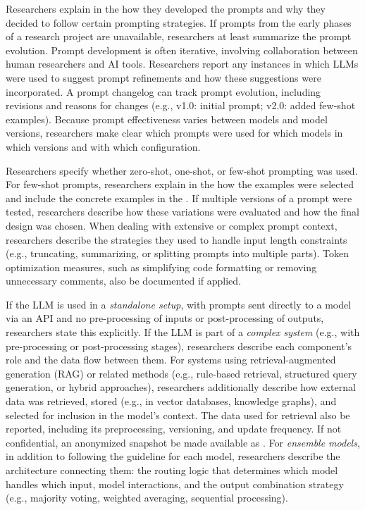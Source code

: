 Researchers \should explain in the \paper how they developed the prompts and why they decided to follow certain prompting strategies.
If prompts from the early phases of a research project are unavailable, researchers \should at least summarize the prompt evolution.
Prompt development is often iterative, involving collaboration between human researchers and AI tools.
Researchers \should report any instances in which LLMs were used to suggest prompt refinements and how these suggestions were incorporated.
A prompt changelog can track prompt evolution, including revisions and reasons for changes (e.g., v1.0: initial prompt; v2.0: added few-shot examples).
Because prompt effectiveness varies between models and model versions, researchers \must make clear which prompts were used for which models in which versions and with which configuration.

Researchers \must specify whether zero-shot, one-shot, or few-shot prompting was used.
For few-shot prompts, researchers \must explain in the \paper how the examples were selected and \should include the concrete examples in the \supplementarymaterial.
If multiple versions of a prompt were tested, researchers \should describe how these variations were evaluated and how the final design was chosen.
When dealing with extensive or complex prompt context, researchers \should describe the strategies they used to handle input length constraints (e.g., truncating, summarizing, or splitting prompts into multiple parts).
Token optimization measures, such as simplifying code formatting or removing unnecessary comments, \should also be documented if applied.

If the LLM is used in a \emph{standalone setup}, with prompts sent directly to a model via an API and no pre-processing of inputs or post-processing of outputs, researchers \must state this explicitly.
If the LLM is part of a \emph{complex system} (e.g., with pre-processing or post-processing stages), researchers \must describe each component's role and the data flow between them.
For systems using retrieval-augmented generation (RAG) or related methods (e.g., rule-based retrieval, structured query generation, or hybrid approaches), researchers \must additionally describe how external data was retrieved, stored (e.g., in vector databases, knowledge graphs), and selected for inclusion in the model's context.
The data used for retrieval \should also be reported, including its preprocessing, versioning, and update frequency. If not confidential, an anonymized snapshot \should be made available as \supplementarymaterial.
For \emph{ensemble models}, in addition to following the \modelversion guideline for each model, researchers \should describe the architecture connecting them: the routing logic that determines which model handles which input, model interactions, and the output combination strategy (e.g., majority voting, weighted averaging, sequential processing).

